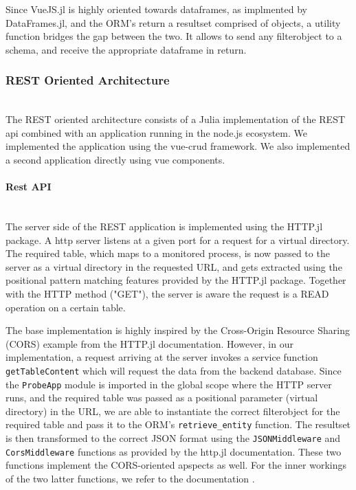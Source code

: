 \documentclass{juliacon}
\begin{document}
Since VueJS.jl is highly oriented towards dataframes, as implmented by DataFrames.jl, and the ORM's return a resultset comprised of objects, a utility function bridges the gap between the two. It allows to send any filterobject to a schema, and receive the appropriate dataframe in return.\vskip 6pt

\subsubsection{REST Oriented Architecture}\hfill\\

The REST oriented architecture consists of a Julia implementation of the REST api combined with an application running in the node.js ecosystem. We implemented the application using the vue-crud \cite{todo} framework. We also implemented a second application directly using vue components.\vskip 6pt

\paragraph{Rest API}\hfill\\

The server side of the REST application is implemented using the HTTP.jl package. A http server listens at a given port for a request for a virtual directory. The required table, which maps to a monitored process, is now passed to the server as a virtual directory in the requested URL, and gets extracted using the positional pattern matching features provided by the HTTP.jl package. Together with the HTTP method ("GET"), the server is aware the request is a READ operation on a certain table.\vskip 6pt

The base implementation is highly inspired by the Cross-Origin Resource Sharing (CORS) example from the HTTP.jl documentation. However, in our implementation, a request arriving at the server invokes a service function \texttt{getTableContent} which will request the data from the backend database. Since the \texttt{ProbeApp} module is imported in the global scope where the HTTP server runs, and the required table was passed as a positional parameter (virtual directory) in the URL, we are able to instantiate the correct filterobject for the required table and pass it to the ORM's \texttt{retrieve\_entity} function. The resultset is then transformed to the correct JSON format using the \texttt{JSONMiddleware} and \texttt{CorsMiddleware} functions as provided by the http.jl documentation. These two functions implement the CORS-oriented apspects as well. For the inner workings of the two latter functions, we refer to the documentation \cite{todo}.\vskip 6pt
\end{document}
